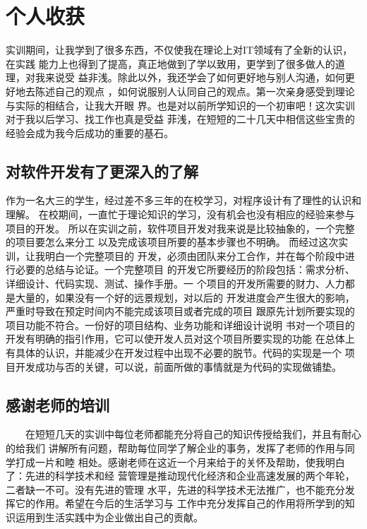 \documentclass[12pt, a4paper, titlepage]{article}
\begin{document}
\section{个人收获}
	实训期间，让我学到了很多东西，不仅使我在理论上对IT领域有了全新的认识，在实践
	能力上也得到了提高，真正地做到了学以致用，更学到了很多做人的道理，对我来说受
	益非浅。除此以外，我还学会了如何更好地与别人沟通，如何更好地去陈述自己的观点
	，如何说服别人认同自己的观点。第一次亲身感受到理论与实际的相结合，让我大开眼
	界。也是对以前所学知识的一个初审吧！这次实训对于我以后学习、找工作也真是受益
	菲浅，在短短的二十几天中相信这些宝贵的经验会成为我今后成功的重要的基石。
\subsection{对软件开发有了更深入的了解}
	作为一名大三的学生，经过差不多三年的在校学习，对程序设计有了理性的认识和理解。
	在校期间，一直忙于理论知识的学习，没有机会也没有相应的经验来参与项目的开发。
	所以在实训之前，软件项目开发对我来说是比较抽象的，一个完整的项目要怎么来分工
	以及完成该项目所要的基本步骤也不明确。 而经过这次实训，让我明白一个完整项目的
	开发，必须由团队来分工合作，并在每个阶段中进行必要的总结与论证。一个完整项目
	的开发它所要经历的阶段包括：需求分析、详细设计、代码实现、测试、操作手册。一
	个项目的开发所需要的财力、人力都是大量的，如果没有一个好的远景规划，对以后的
	开发进度会产生很大的影响，严重时导致在预定时间内不能完成该项目或者完成的项目
	跟原先计划所要实现的项目功能不符合。一份好的项目结构、业务功能和详细设计说明
	书对一个项目的开发有明确的指引作用，它可以使开发人员对这个项目所要实现的功能
	在总体上有具体的认识，并能减少在开发过程中出现不必要的脱节。代码的实现是一个
	项目开发成功与否的关键，可以说，前面所做的事情就是为代码的实现做铺垫。
\subsection{感谢老师的培训}
　　在短短几天的实训中每位老师都能充分将自己的知识传授给我们，并且有耐心的给我们
	讲解所有问题，帮助每位同学了解企业的事务，发挥了老师的作用与同学打成一片和睦
	相处。感谢老师在这近一个月来给于的关怀及帮助，使我明白了：先进的科学技术和经
	营管理是推动现代化经济和企业高速发展的两个年轮，二者缺一不可。没有先进的管理
	水平，先进的科学技术无法推广，也不能充分发挥它的作用。希望在今后的生活学习与
	工作中充分发挥自己的作用将所学到的知识运用到生活实践中为企业做出自己的贡献。
\end{document}
